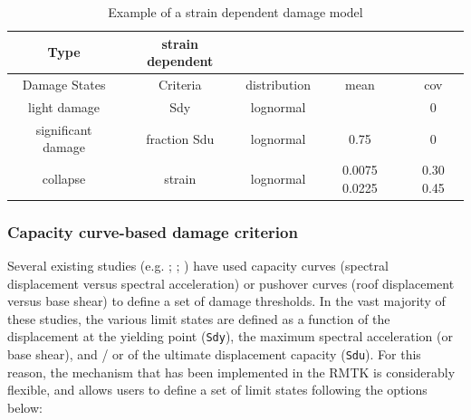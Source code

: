\begin {table}[htb]
\caption{Example of a strain dependent damage model}
\label{table:strain-dmg}
\begin{center}
  \begin{tabular}{ | c | c | c | c | c |}
  \hline
Type & strain dependent &  &  &  \\ \hline
Damage States & Criteria & distribution & mean & cov  \\ \hline
light damage & Sdy & lognormal &  & 0 \\ \hline
significant damage & fraction Sdu & lognormal & 0.75 & 0 \\ \hline
collapse & strain & lognormal & 0.0075 0.0225 & 0.30 0.45 \\ \hline
  \end{tabular}
\end{center}
\end{table}

\subsubsection{Capacity curve-based damage criterion}
\label{subsubsec:cc-dmg}
Several existing studies (e.g. \cite{Erberik2008}; \cite{SilvaEtAl2014c}; \cite{CasottoEtAl2005}) have used capacity curves (spectral displacement versus spectral acceleration) or pushover curves (roof displacement versus base shear) to define a set of damage thresholds. In the vast majority of these studies, the various limit states are defined as a function of the displacement at the yielding point (\verb=Sdy=), the maximum spectral acceleration (or base shear), and / or of the ultimate displacement capacity (\verb=Sdu=). For this reason, the mechanism that has been implemented in the RMTK is considerably flexible, and allows users to define a set of limit states following the options below:\\

